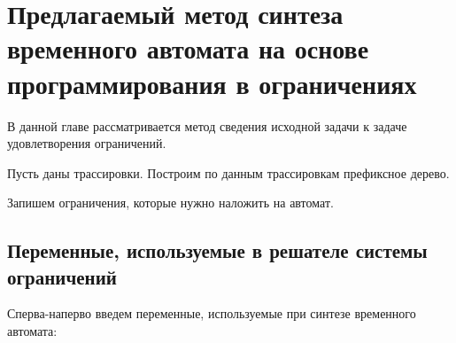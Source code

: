 \documentclass[times,specification,annotation]{itmo-student-thesis}
\begin{document}
\finishrelatedwork

\chapter{Предлагаемый метод синтеза временного автомата на основе программирования в ограничениях}

В данной главе рассматривается метод сведения исходной задачи к задаче удовлетворения ограничений. 

Пусть даны трассировки. Построим по данным трассировкам префиксное дерево.

Запишем ограничения, которые нужно наложить на автомат.

\section{Переменные, используемые в решателе системы ограничений}

Сперва-наперво введем переменные, используемые при синтезе временного автомата:
\end{document}
